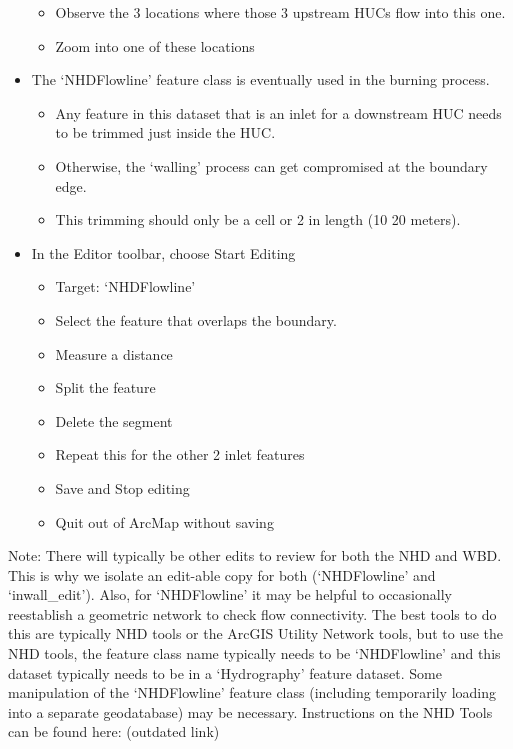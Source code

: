 \documentclass[letterpaper,10pt,english]{sphinxmanual}
\begin{document}
\begin{itemize}
\begin{itemize}
\item {} 
Observe the 3 locations where those 3 upstream HUCs flow into this one.

\item {} 
Zoom into one of these locations

\end{itemize}

\item {} 
The ‘NHDFlowline’ feature class is eventually used in the burning process.
\begin{itemize}
\item {} 
Any feature in this dataset that is an inlet for a downstream HUC needs to be trimmed just inside the HUC.

\item {} 
Otherwise, the ‘walling’ process can get compromised at the boundary edge.

\item {} 
This trimming should only be a cell or 2 in length (10 \textendash{} 20 meters).

\end{itemize}

\item {} 
In the Editor toolbar, choose  Start Editing
\begin{itemize}
\item {} 
Target: ‘NHDFlowline’

\item {} 
Select the feature that overlaps the boundary.

\item {} 
Measure a distance

\item {} 
Split the feature

\item {} 
Delete the segment

\item {} 
Repeat this for the other 2 inlet features

\item {} 
Save and Stop editing

\item {} 
Quit out of ArcMap without saving

\end{itemize}

\end{itemize}

Note: There will typically be other edits to review for both the NHD and WBD.  This is why we isolate an edit-able copy for both (‘NHDFlowline’ and ‘inwall\_edit’). Also, for ‘NHDFlowline’ it may be helpful to occasionally reestablish a geometric network to check flow connectivity.  The best tools to do this are typically NHD tools or the ArcGIS Utility Network tools, but to use the NHD tools,  the feature class name typically needs to be ‘NHDFlowline’ and this dataset typically needs to be in a ‘Hydrography’ feature dataset.  Some manipulation of the ‘NHDFlowline’ feature class (including temporarily loading into a separate geodatabase) may be necessary. Instructions on the NHD Tools can be found here: (outdated link)
\end{document}
